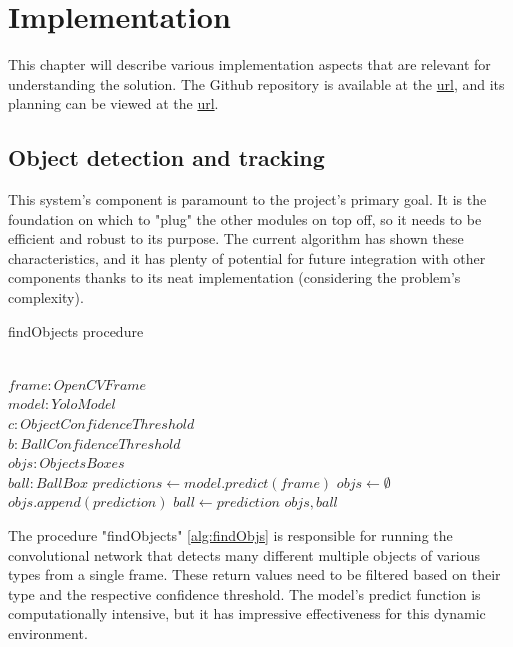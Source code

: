 \documentclass[
    11pt,
    oneside
]{report}
\begin{document}
\chapter{Implementation}




This chapter will describe various implementation aspects that are relevant for understanding the solution. The Github repository is available at the \href{https://github.com/xecarlox94/Computational-Imaging}{url}, and its planning can be viewed at the \href{URL}{url}.







\section{Object detection and tracking}

This system's component is paramount to the project's primary goal. It is the foundation on which to "plug" the other modules on top off, so it needs to be efficient and robust to its purpose. The current algorithm has shown these characteristics, and it has plenty of potential for future integration with other components thanks to its neat implementation (considering the problem's complexity).


\begin{algorithm}[H]
\begin{algorithmic}
\caption{findObjects procedure}\label{alg:findObjs}
\Require \\
    $frame: OpenCVFrame$ \\
    $model: YoloModel$ \\
    $c: ObjectConfidenceThreshold$ \\
    $b: BallConfidenceThreshold$
\Ensure \\
    $objs: ObjectsBoxes$ \\
    $ball: BallBox$
\State
\State $predictions \gets model.predict(frame)$
\State $objs \gets \emptyset$
        \State $objs.append(prediction)$
    \EndIf
        \State $ball \gets prediction$
    \EndIf
\EndFor
\State
\Return $objs, ball$
\end{algorithmic}
\end{algorithm}


The procedure "findObjects" \ref{alg:findObjs} is responsible for running the convolutional network that detects many different multiple objects of various types from a single frame. These return values need to be filtered based on their type and the respective confidence threshold. The model's predict function is computationally intensive, but it has impressive effectiveness for this dynamic environment.
\end{document}
